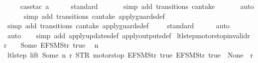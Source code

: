\begin{isabellebody}
\ \ \ \isamarkupfalse%
\ {\isacharparenleft}case{\isacharunderscore}tac\ {\isachardoublequoteopen}a{\isacharequal}{}{\isachardoublequoteclose}{\isacharparenright}\isanewline
\ \ \ \ \isamarkupfalse%
\ standard\isanewline
\ \ \ \ \ \isamarkupfalse%
\ {\isacharparenleft}simp\ add{\isacharcolon}\ transitions\ can{\isacharunderscore}take{\isacharparenright}\isanewline
\ \ \ \ \ \isamarkupfalse%
\ auto{\isacharbrackleft}{}{\isacharbrackright}\isanewline
\ \ \ \ \isamarkupfalse%
\ {\isacharparenleft}simp\ add{\isacharcolon}\ transitions\ can{\isacharunderscore}take\ apply{\isacharunderscore}guards{\isacharunderscore}def{\isacharparenright}\isanewline
\ \ \ \isamarkupfalse%
\ {\isacharparenleft}simp\ add{\isacharcolon}\ transitions\ can{\isacharunderscore}take\ apply{\isacharunderscore}guards{\isacharunderscore}def{\isacharparenright}\isanewline
\ \ \ \isamarkupfalse%
\ standard\isanewline
\ \ \ \ \isamarkupfalse%
\ auto{\isacharbrackleft}{}{\isacharbrackright}\isanewline
\ \ \ \isamarkupfalse%
\ auto{\isacharbrackleft}{}{\isacharbrackright}\isanewline
\ \ \isamarkupfalse%
\ {\isacharparenleft}simp\ add{\isacharcolon}\ apply{\isacharunderscore}updates{\isacharunderscore}def\ apply{\isacharunderscore}outputs{\isacharunderscore}def{\isacharparenright}%
\endisatagproof
{\isafoldproof}%
%
\isadelimproof
\isanewline
%
\endisadelimproof
\isanewline
{}\isamarkupfalse%
\ ltl{\isacharunderscore}step{\isacharunderscore}motorstop{\isacharunderscore}invalid{\isacharunderscore}r{}{\isacharcolon}\isanewline
{\isachardoublequoteopen}r\ {\isachardollar}\ {}\ {\isasymnoteq}\ Some\ {\isacharparenleft}EFSM{\isachardot}Str\ {\isacharprime}{\isacharprime}true{\isacharprime}{\isacharprime}{\isacharparenright}\ {\isasymLongrightarrow}\isanewline
\ n\ {\isasymin}\ {\isacharbraceleft}{}{\isacharcomma}\ {}{\isacharcomma}\ {}{\isacharcomma}\ {}{\isacharbraceright}\ {\isasymLongrightarrow}\isanewline
\ ltl{\isacharunderscore}step\ lift\ {\isacharparenleft}Some\ n{\isacharparenright}\ r\ {\isacharparenleft}STR\ {\isacharprime}{\isacharprime}motorstop{\isacharprime}{\isacharprime}{\isacharcomma}\ {\isacharbrackleft}EFSM{\isachardot}Str\ {\isacharprime}{\isacharprime}true{\isacharprime}{\isacharprime}{\isacharcomma}\ EFSM{\isachardot}Str\ {\isacharprime}{\isacharprime}true{\isacharprime}{\isacharprime}{\isacharbrackright}{\isacharparenright}\ {\isacharequal}\ {\isacharparenleft}None{\isacharcomma}\ {\isacharbrackleft}{\isacharbrackright}{\isacharcomma}\ r{\isacharparenright}{\isachardoublequoteclose}\isanewline

\end{isabellebody}
